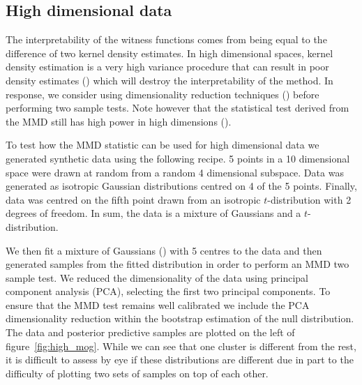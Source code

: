 \documentclass{article} %
\begin{document}
\subsection{High dimensional data}

\label{sec:high_dim}

The interpretability of the witness functions comes from being equal to the difference of two kernel density estimates.
In high dimensional spaces, kernel density estimation is a very high variance procedure that can result in poor density estimates () which will destroy the interpretability of the method.
In response, we consider using dimensionality reduction techniques () before performing two sample tests.
Note however that the statistical test derived from the MMD still has high power in high dimensions ().

To test how the MMD statistic can be used for high dimensional data we generated synthetic data using the following recipe.
5 points in a 10 dimensional space were drawn at random from a random 4 dimensional subspace\footnotemark.
Data was generated as isotropic Gaussian distributions centred on 4 of the 5 points.
Finally, data was centred on the fifth point drawn from an isotropic $t$-distribution with 2 degrees of freedom.
In sum, the data is a mixture of Gaussians and a $t$-distribution.

We then fit a mixture of Gaussians () with 5 centres to the data and then generated samples from the fitted distribution in order to perform an MMD two sample test.
We reduced the dimensionality of the data using principal component analysis (PCA), selecting the first two principal components.
To ensure that the MMD test remains well calibrated we include the PCA dimensionality reduction within the bootstrap estimation of the null distribution.
The data and posterior predictive samples are plotted on the left of figure~\ref{fig:high_mog}.
While we can see that one cluster is different from the rest, it is difficult to assess by eye if these distributions are different due in part to the difficulty of plotting two sets of samples on top of each other.
\end{document}
